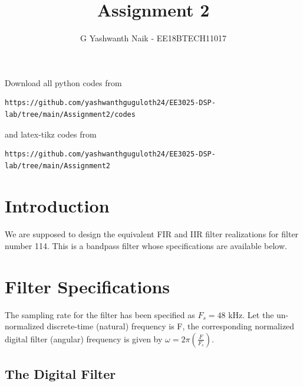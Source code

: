 \documentclass[journal,12pt,twocolumn]{IEEEtran}
\begin{document}
\def\putbox#1#2#3{\makebox[0in][l]{\makebox[#1][l]{}\raisebox{\baselineskip}[0in][0in]{\raisebox{#2}[0in][0in]{#3}}}}
     \def\rightbox#1{\makebox[0in][r]{#1}}
     \def\centbox#1{\makebox[0in]{#1}}
     \def\topbox#1{\raisebox{-\baselineskip}[0in][0in]{#1}}
     \def\midbox#1{\raisebox{-0.5\baselineskip}[0in][0in]{#1}}
\vspace{3cm}
\title{Assignment 2}
\author{G Yashwanth Naik - EE18BTECH11017}
\maketitle
\newpage
\bigskip
\renewcommand{\thefigure}{\theenumi}
\renewcommand{\thetable}{\theenumi}
Download all python codes from 
\begin{lstlisting}
https://github.com/yashwanthguguloth24/EE3025-DSP-lab/tree/main/Assignment2/codes
\end{lstlisting}
%
and latex-tikz codes from 
%
\begin{lstlisting}
https://github.com/yashwanthguguloth24/EE3025-DSP-lab/tree/main/Assignment2
\end{lstlisting}
\section{Introduction}
We are supposed to design the equivalent FIR and IIR filter realizations for filter number 114.  
This is a bandpass filter whose specifications are available below.
\section{Filter Specifications}
The sampling rate for the filter has been specified as $F_s =  48$ kHz. Let the un-normalized  discrete-time (natural) frequency is F, the corresponding normalized digital filter (angular) frequency is given by $\omega = 2\pi
\left(\frac{F}{F_s}\right)$.

\subsection{The Digital Filter}
\end{document}
